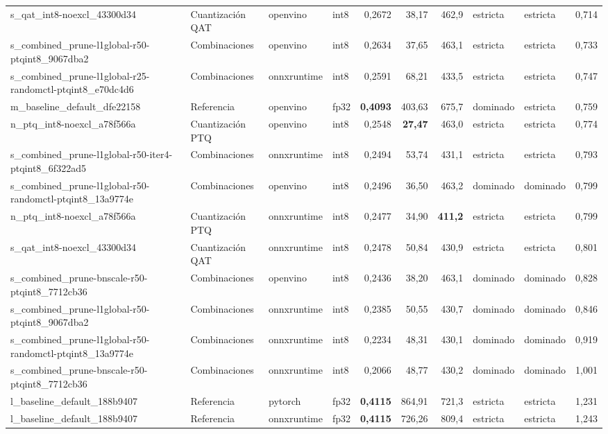 \begin{landscape}
\begin{table}[htbp]
\begin{adjustbox}{max width=\linewidth, max totalheight=\dimexpr\textheight-\ht\tfmedgetitle-\dp\tfmedgetitle-\ht\tfmedgenotes-\dp\tfmedgenotes-6pt\relax}
\begin{tabular}{llllrrrllr}
    s\_qat\_int8-noexcl\_43300d34 & Cuantización QAT & openvino & int8 & 0,2672 & 38,17 & 462,9 & estricta & estricta & 0,714 \\
    s\_combined\_prune-l1global-r50-ptqint8\_9067dba2 & Combinaciones & openvino & int8 & 0,2634 & 37,65 & 463,1 & estricta & estricta & 0,733 \\
    s\_combined\_prune-l1global-r25-randomctl-ptqint8\_e70dc4d6 & Combinaciones & onnxruntime & int8 & 0,2591 & 68,21 & 433,5 & estricta & estricta & 0,747 \\
    m\_baseline\_default\_dfe22158 & Referencia & openvino & fp32 & \textbf{0,4093} & 403,63 & 675,7 & dominado & estricta & 0,759 \\
    n\_ptq\_int8-noexcl\_a78f566a & Cuantización PTQ & openvino & int8 & 0,2548 & \textbf{27,47} & 463,0 & estricta & estricta & 0,774 \\
    s\_combined\_prune-l1global-r50-iter4-ptqint8\_6f322ad5 & Combinaciones & onnxruntime & int8 & 0,2494 & 53,74 & 431,1 & estricta & estricta & 0,793 \\
    s\_combined\_prune-l1global-r50-randomctl-ptqint8\_13a9774e & Combinaciones & openvino & int8 & 0,2496 & 36,50 & 463,2 & dominado & dominado & 0,799 \\
    n\_ptq\_int8-noexcl\_a78f566a & Cuantización PTQ & onnxruntime & int8 & 0,2477 & 34,90 & \textbf{411,2} & estricta & estricta & 0,799 \\
    s\_qat\_int8-noexcl\_43300d34 & Cuantización QAT & onnxruntime & int8 & 0,2478 & 50,84 & 430,9 & estricta & estricta & 0,801 \\
    s\_combined\_prune-bnscale-r50-ptqint8\_7712cb36 & Combinaciones & openvino & int8 & 0,2436 & 38,20 & 463,1 & dominado & dominado & 0,828 \\
    s\_combined\_prune-l1global-r50-ptqint8\_9067dba2 & Combinaciones & onnxruntime & int8 & 0,2385 & 50,55 & 430,7 & dominado & dominado & 0,846 \\
    s\_combined\_prune-l1global-r50-randomctl-ptqint8\_13a9774e & Combinaciones & onnxruntime & int8 & 0,2234 & 48,31 & 430,1 & dominado & dominado & 0,919 \\
    s\_combined\_prune-bnscale-r50-ptqint8\_7712cb36 & Combinaciones & onnxruntime & int8 & 0,2066 & 48,77 & 430,2 & dominado & dominado & 1,001 \\
    l\_baseline\_default\_188b9407 & Referencia & pytorch & fp32 & \textbf{0,4115} & 864,91 & 721,3 & estricta & estricta & 1,231 \\
    l\_baseline\_default\_188b9407 & Referencia & onnxruntime & fp32 & \textbf{0,4115} & 726,26 & 809,4 & estricta & estricta & 1,243 \\

\end{tabular}
\end{adjustbox}
\end{table}
\end{landscape}

